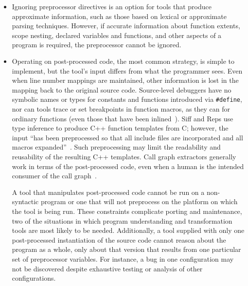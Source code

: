 \documentclass[10pt]{article}
\begin{document}
\begin{itemize}

\item Ignoring preprocessor directives is an option for tools that produce
  approximate information, such as those based on lexical or approximate
  parsing techniques.  However, if accurate information about function
  extents, scope nesting, declared variables and functions, and other
  aspects of a program is required, the preprocessor cannot be ignored.

\item Operating on post-processed code, the most common strategy, is
  simple to implement, but the tool's input differs from what the
  programmer sees.  Even when line number mappings are maintained, other
  information is lost in the mapping back to the original source code.
  Source-level debuggers have no symbolic names or types for constants and
  functions introduced via {\tt \#define}, nor can tools trace or set
  breakpoints in function macros, as they can for ordinary functions (even
  those that have been inlined~\cite{Zellweger83:TR}).  Siff and Reps use
  type inference to produce C++ function templates from C; however, the
  input ``has been preprocessed so
  that all include files are incorporated and all macros
  expanded''~\cite[p.~145]{Siff-fse96}.  Such preprocessing may limit the
  readability and reusability of the resulting C++ templates.  Call graph
  extractors generally work in terms of the post-processed code, even when
  a human is the intended consumer of the call graph~\cite{Murphy-icse18}.

  
  A tool that manipulates post-processed code cannot be run on a
  non-syntactic program or one that will not preprocess on the platform on
  which the tool is being run.  These constraints complicate porting and
  maintenance, two of the situations in which program understanding and
  transformation tools are most likely to be needed.  Additionally, a tool
  supplied with only one post-processed instantiation of the source code
  cannot reason about the program as a whole, only about that version that
  results from one particular set of preprocessor variables.  For instance,
  a bug in one configuration may not be discovered despite exhaustive
  testing or analysis of other configurations.


\end{itemize}
\end{document}
